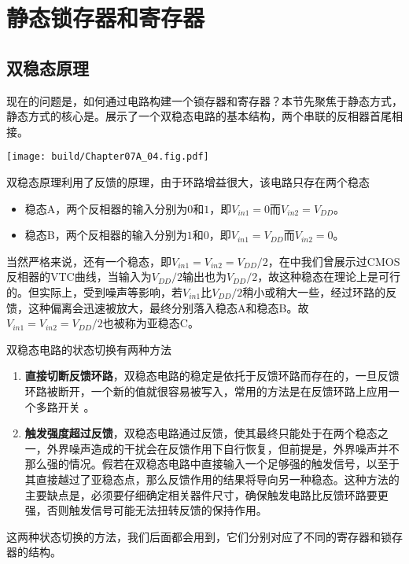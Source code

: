 \section{静态锁存器和寄存器}

\subsection{双稳态原理}

现在的问题是，如何通过电路构建一个锁存器和寄存器？本节先聚焦于静态方式，静态方式的核心是。展示了一个双稳态电路的基本结构，两个串联的反相器首尾相接。
\begin{Figure}[双稳态原理]
    \texttt{[image: build/Chapter07A\_04.fig.pdf]}
\end{Figure}

双稳态原理利用了反馈的原理，由于环路增益很大，该电路只存在两个稳态
\begin{itemize}
    \item 稳态A，两个反相器的输入分别为$0$和$1$，即$V_{in1}=0$而$V_{in2}=V_{DD}$。
    \item 稳态B，两个反相器的输入分别为$1$和$0$，即$V_{in1}=V_{DD}$而$V_{in2}=0$。
\end{itemize}
当然严格来说，还有一个稳态，即$V_{in1}=V_{in2}=V_{DD}/2$，在中我们曾展示过CMOS反相器的VTC曲线，当输入为$V_{DD}/2$输出也为$V_{DD}/2$，故这种稳态在理论上是可行的。但实际上，受到噪声等影响，若$V_{in1}$比$V_{DD}/2$稍小或稍大一些，经过环路的反馈，这种偏离会迅速被放大，最终分别落入稳态A和稳态B。故$V_{in1}=V_{in2}=V_{DD}/2$也被称为亚稳态C。

双稳态电路的状态切换有两种方法
\begin{enumerate}
    \item \textbf{直接切断反馈环路}，双稳态电路的稳定是依托于反馈环路而存在的，一旦反馈环路被断开，一个新的值就很容易被写入，常用的方法是在反馈环路上应用一个多路开关 。
    \item \textbf{触发强度超过反馈}，双稳态电路通过反馈，使其最终只能处于在两个稳态之一，外界噪声造成的干扰会在反馈作用下自行恢复，但前提是，外界噪声并不那么强的情况。假若在双稳态电路中直接输入一个足够强的触发信号，以至于其直接越过了亚稳态点，那么反馈作用的结果将导向另一种稳态。这种方法的主要缺点是，必须要仔细确定相关器件尺寸，确保触发电路比反馈环路要更强，否则触发信号可能无法扭转反馈的保持作用。
\end{enumerate}
这两种状态切换的方法，我们后面都会用到，它们分别对应了不同的寄存器和锁存器的结构。

